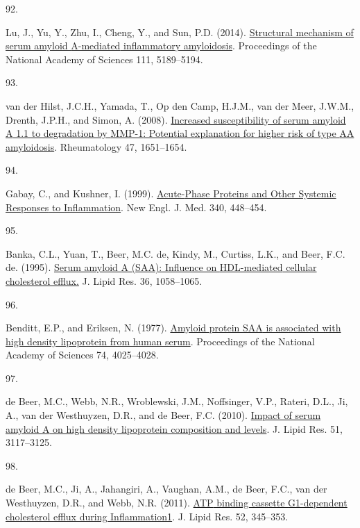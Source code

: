 \documentclass[
]{article}
\newlength{\cslhangindent}
\newlength{\csllabelwidth}
\newlength{\cslentryspacingunit} %
\newenvironment{CSLReferences}[2] %
 {%
  \setlength{\parindent}{0pt}
  \ifodd #1
  \let\oldpar\par
  \def\par{\hangindent=\cslhangindent\oldpar}
  \fi
  \setlength{\parskip}{#2\cslentryspacingunit}
 }%
 {}
\newcommand{\CSLLeftMargin}[1]{\parbox[t]{\csllabelwidth}{#1}}
\newcommand{\CSLRightInline}[1]{\parbox[t]{\linewidth - \csllabelwidth}{#1}\break}
\begin{document}
\begin{CSLReferences}{0}{0}
\leavevmode{}%
\CSLLeftMargin{92. }
\CSLRightInline{Lu, J., Yu, Y., Zhu, I., Cheng, Y., and Sun, P.D. (2014). \href{https://doi.org/10.1073/pnas.1322357111}{Structural mechanism of serum amyloid {A-mediated} inflammatory amyloidosis}. Proceedings of the National Academy of Sciences 111, 5189--5194.}

\leavevmode{}%
\CSLLeftMargin{93. }
\CSLRightInline{van der Hilst, J.C.H., Yamada, T., Op den Camp, H.J.M., van der Meer, J.W.M., Drenth, J.P.H., and Simon, A. (2008). \href{https://doi.org/10.1093/rheumatology/ken371}{Increased susceptibility of serum amyloid {A} 1.1 to degradation by {MMP-1}: Potential explanation for higher risk of type {AA} amyloidosis}. Rheumatology 47, 1651--1654.}

\leavevmode{}%
\CSLLeftMargin{94. }
\CSLRightInline{Gabay, C., and Kushner, I. (1999). \href{https://doi.org/10.1056/NEJM199902113400607}{Acute-{Phase Proteins} and {Other Systemic Responses} to {Inflammation}}. New Engl. J. Med. 340, 448--454.}

\leavevmode{}%
\CSLLeftMargin{95. }
\CSLRightInline{Banka, C.L., Yuan, T., Beer, M.C. de, Kindy, M., Curtiss, L.K., and Beer, F.C. de. (1995). \href{https://www.ncbi.nlm.nih.gov/pubmed/7658153}{Serum amyloid {A} ({SAA}): Influence on {HDL-mediated} cellular cholesterol efflux.} J. Lipid Res. 36, 1058--1065.}

\leavevmode{}%
\CSLLeftMargin{96. }
\CSLRightInline{Benditt, E.P., and Eriksen, N. (1977). \href{https://doi.org/10.1073/pnas.74.9.4025}{Amyloid protein {SAA} is associated with high density lipoprotein from human serum}. Proceedings of the National Academy of Sciences 74, 4025--4028.}

\leavevmode{}%
\CSLLeftMargin{97. }
\CSLRightInline{de Beer, M.C., Webb, N.R., Wroblewski, J.M., Noffsinger, V.P., Rateri, D.L., Ji, A., van der Westhuyzen, D.R., and de Beer, F.C. (2010). \href{https://doi.org/10.1194/jlr.M005413}{Impact of serum amyloid {A} on high density lipoprotein composition and levels}. J. Lipid Res. 51, 3117--3125.}

\leavevmode{}%
\CSLLeftMargin{98. }
\CSLRightInline{de Beer, M.C., Ji, A., Jahangiri, A., Vaughan, A.M., de Beer, F.C., van der Westhuyzen, D.R., and Webb, N.R. (2011). \href{https://doi.org/10.1194/jlr.M012328}{{ATP} binding cassette {G1-dependent} cholesterol efflux during Inflammation1}. J. Lipid Res. 52, 345--353.}


\end{CSLReferences}
\end{document}
